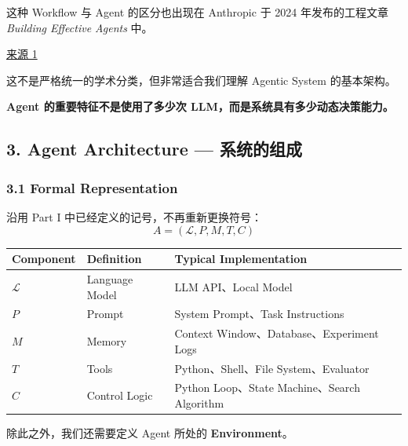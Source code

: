 这种 Workflow 与 Agent 的区分也出现在 Anthropic 于 2024 年发布的工程文章 \emph{Building Effective Agents} 中。

\href{https://www.anthropic.com/research/building-effective-agents?aff=47lw0}{来源 1}

这不是严格统一的学术分类，但非常适合我们理解 Agentic System 的基本架构。

\textbf{Agent 的重要特征不是使用了多少次 LLM，而是系统具有多少动态决策能力。}

\hypertarget{part-3-31-0001-agent-architecture-ux7cfbux7edfux7684ux7ec4ux6210}{%
\subsection{3. Agent Architecture --- 系统的组成}\label{part-3-31-0001-agent-architecture-ux7cfbux7edfux7684ux7ec4ux6210}}

\hypertarget{part-3-31-0001-formal-representation}{%
\subsubsection{3.1 Formal Representation}\label{part-3-31-0001-formal-representation}}

沿用 Part I 中已经定义的记号，不再重新更换符号：
\[\boxed{
A=(\mathcal L,P,M,T,C)
}\]

\begin{readertable}
\begin{longtable}[]{@{}
  >{\raggedright\arraybackslash}p{}
  >{\raggedright\arraybackslash}p{}
  >{\raggedright\arraybackslash}p{}@{}}
\toprule
Component & Definition & Typical Implementation \\
\midrule
\endhead
\(\mathcal L\) & Language Model & LLM API、Local Model \\
\(P\) & Prompt & System Prompt、Task Instructions \\
\(M\) & Memory & Context Window、Database、Experiment Logs \\
\(T\) & Tools & Python、Shell、File System、Evaluator \\
\(C\) & Control Logic & Python Loop、State Machine、Search Algorithm \\
\bottomrule
\end{longtable}
\end{readertable}

除此之外，我们还需要定义 Agent 所处的 \textbf{Environment}。

